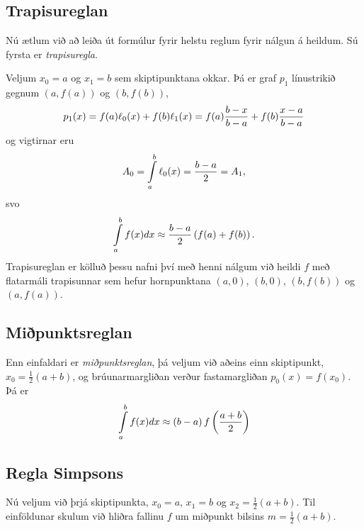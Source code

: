 \documentclass[letterpaper,10pt,icelandic]{sphinxmanual}
\begin{document}

\subsection{Trapisureglan}
\label{kafli05:index-2}\label{kafli05:trapisureglan}
Nú ætlum við að leiða út formúlur fyrir helstu reglum fyrir nálgun á
heildum. Sú fyrsta er \emph{trapisuregla}.

Veljum \(x_0 = a\) og \(x_1 = b\) sem skiptipunktana okkar. Þá
er graf \(p_1\) línustrikið gegnum \((a,f(a))\) og
\((b,f(b))\),
\begin{gather}
\begin{split}p_1(x) = f(a) \ell_0(x) + f(b) \ell_1(x)
  = f(a)\frac{b-x}{b-a} + f(b) \frac{x-a}{b-a}\end{split}\notag
\end{gather}
og vigtirnar eru
\begin{gather}
\begin{split}A_0 = \int\limits_a^b \ell_0(x) = \frac{b-a}{2} = A_1,\end{split}\notag
\end{gather}
svo
\begin{gather}
\begin{split}\int\limits_a^b f(x) dx \approx
  \frac{b-a}{2}\left(f(a)+f(b)\right).\end{split}\notag
\end{gather}
Trapisureglan er kölluð þessu nafni því með henni nálgum við heildi
\(f\) með flatarmáli trapisunnar sem hefur hornpunktana
\((a,0)\), \((b,0)\), \((b,f(b))\) og \((a,f(a))\).


\subsection{Miðpunktsreglan}
\label{kafli05:index-3}\label{kafli05:mipunktsreglan}
Enn einfaldari er \emph{miðpunktsreglan}, þá veljum við aðeins einn
skiptipunkt, \(x_0 = \frac{1}{2}(a+b)\), og brúunarmargliðan verður
fastamargliðan \(p_0(x) = f(x_0)\). Þá er
\begin{gather}
\begin{split}\int\limits_a^b f(x) dx \approx (b-a)\, f\left(\frac{a+b}{2}\right)\end{split}\notag
\end{gather}

\subsection{Regla Simpsons}
\label{kafli05:index-4}\label{kafli05:regla-simpsons}
Nú veljum við þrjá skiptipunkta, \(x_0 = a\), \(x_1 = b\) og
\(x_2 =
\frac{1}{2}(a+b)\). Til einföldunar skulum við hliðra fallinu \(f\)
um miðpunkt bilsins \(m=\tfrac{1}{2}(a+b)\).
\end{document}
